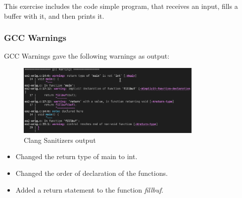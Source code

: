 \documentclass{article}
\begin{document}
This exercise includes the code simple program, that receives an input, fills a buffer with it, and then prints it.

\subsubsection{GCC Warnings}

GCC Warnings gave the following warnings as output:

\begin{figure}[ht!]
    \centering
    \includegraphics[width=0.8\textwidth]{images/ex2/gccWarnings.png}
    \caption{Clang Sanitizers output}\label{fig:ex2/gccWarnings}
\end{figure}


\begin{itemize}
    \item Changed the return type of main to int.
    \item Changed the order of declaration of the functions.
    \item Added a return statement to the function \textit{fillbuf}.
\end{itemize}
\end{document}
